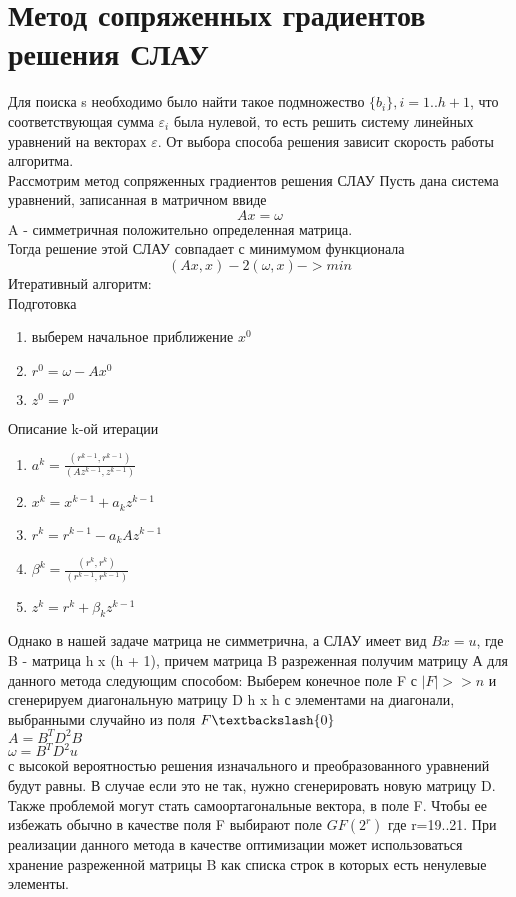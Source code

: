 \documentclass[14pt,a4paper,]{article}
\def\EPS{\varepsilon}         %
\begin{document}
    \section{Метод сопряженных градиентов решения СЛАУ}
    Для поиска s необходимо было найти такое подмножество $\{b_i\}, i = 1 .. h + 1$, что соответствующая сумма $\EPS_i$ была нулевой, то есть решить систему линейных уравнений на векторах $\EPS$. От выбора способа решения зависит скорость работы алгоритма. \\
    Рассмотрим метод сопряженных градиентов решения СЛАУ
    Пусть дана система уравнений, записанная в матричном ввиде
    $$ Ax = \omega $$
    A - симметричная положительно определенная матрица. \\
    Тогда решение этой СЛАУ совпадает с минимумом функционала $$ (Ax, x) - 2(\omega, x) -> min $$
    Итеративный алгоритм:\\
    Подготовка
    \begin{enumerate}
        \item выберем начальное приближение $x^0$
        \item $r^0 = \omega - Ax^0$
        \item $z^0 = r^0$
    \end{enumerate}
    Описание k-ой итерации
    \begin{enumerate}
        \item $a^k = \frac{(r^{k-1}, r^{k-1})}{(Az^{k-1}, z^{k-1})} $
        \item $ x^k = x^{k-1} + a_k z^{k-1}$
        \item $ r^k = r^{k-1} - a_k A z^{k-1}$
        \item $ \beta ^ k = \frac{(r^k, r^k)}{(r^{k-1}, r^{k-1})}$
        \item $ z^k = r^k + \beta_k z^{k-1}$
    \end{enumerate}
    Однако в нашей задаче матрица не симметрична, а СЛАУ имеет вид $Bx = u$, где B - матрица  h x (h + 1), причем матрица B разреженная
    получим матрицу А для данного метода следующим способом:
    Выберем конечное поле F с $ |F| >> n $ и сгенерируем диагональную матрицу D h x h с элементами на диагонали, выбранными случайно из поля $F\textbackslash\{0\}$  \\
    $ A = B^T D^2 B$\\
    $ \omega = B^T D^2 u $\\
    с высокой вероятностью решения изначального и преобразованного уравнений будут равны. В случае если это не так, нужно сгенерировать новую матрицу D. Также проблемой могут стать самоортагональные вектора, в поле F. Чтобы ее избежать обычно в качестве поля F выбирают поле $GF(2^r)$ где r=19..21.
    При реализации данного метода в качестве оптимизации может использоваться хранение разреженной матрицы B как списка строк в которых есть ненулевые элементы.
\end{document}
